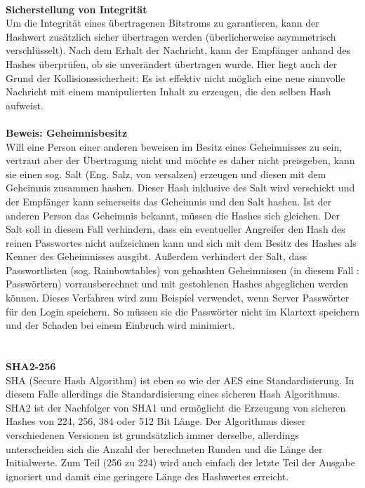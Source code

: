 \documentclass[13pt,a4paper,bibliography=totocnumbered,listof=totocnumbered]{scrartcl}
\begin{document}
\\\textbf{Sicherstellung von Integrität}\\
Um die Integrität eines übertragenen Bitstroms zu garantieren, kann der Hashwert zusätzlich sicher übertragen werden (überlicherweise asymmetrisch verschlüsselt). Nach dem Erhalt der Nachricht, kann der Empfänger anhand des Hashes überprüfen, ob sie unverändert übertragen wurde. Hier liegt auch der Grund der Kollisionssicherheit: Es ist effektiv nicht möglich eine neue sinnvolle Nachricht mit einem manipulierten Inhalt zu erzeugen, die den selben Hash aufweist.\\
\\\textbf{Beweis: Geheimnisbesitz}\\
Will eine Person einer anderen beweisen im Besitz eines Geheimnisses zu sein, vertraut aber der Übertragung nicht und möchte es daher nicht preisgeben, kann sie einen sog. Salt (Eng. Salz, von versalzen) erzeugen und diesen mit dem Geheimnis zusammen hashen. Dieser Hash inklusive des Salt wird verschickt und der Empfänger kann seinerseits das Geheimnis und den Salt hashen. Ist der anderen Person das Geheimnis bekannt, müssen die Hashes sich gleichen. Der Salt soll in diesem Fall verhindern, dass ein eventueller Angreifer den Hash des reinen Passwortes nicht aufzeichnen kann und sich mit dem Besitz des Hashes als Kenner des Geheimnisses ausgibt. Außerdem verhindert der Salt, dass Passwortlisten (sog. Rainbowtables) von gehashten Geheimnissen (in diesem Fall : Passwörtern) vorrausberechnet und mit gestohlenen Hashes abgeglichen werden können. Dieses Verfahren wird zum Beispiel verwendet, wenn Server Passwörter für den Login speichern. So müssen sie die Passwörter nicht im Klartext speichern und der Schaden bei einem Einbruch wird minimiert.\\
 \cite[S. 31ff]{48} \cite[S. 35f]{42}\\
\\\textbf{SHA2-256}\\
SHA (Secure Hash Algorithm) ist eben so wie der AES eine Standardisierung. In diesem Falle allerdings die Standardisierung eines sicheren Hash Algorithmus. SHA2 ist der Nachfolger von SHA1 und ermöglicht die Erzeugung von sicheren Hashes von 224, 256, 384 oder 512 Bit Länge. Der Algorithmus dieser verschiedenen Versionen ist grundsätzlich immer derselbe, allerdings unterscheiden sich die Anzahl der berechneten Runden und die Länge der Initialwerte. Zum Teil (256 zu 224) wird auch einfach der letzte Teil der Ausgabe ignoriert und damit eine geringere Länge des Hashwertes erreicht.\\
\cite[S. 5f]{13}\cite[S. 3, 7f, 10f]{10}
\end{document}
